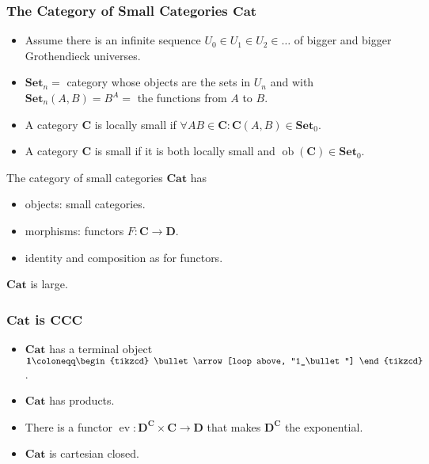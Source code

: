 \documentclass[UTF8,11pt,colorlinks,compress,openany]{beamer}%
\begin{document}
\begin{frame}\frametitle{The Category of Small Categories $\mathbf{Cat}$}
\begin{itemize}
	\item Assume there is an infinite sequence $U_0\in U_1\in U_2\in\dots$ of bigger and bigger Grothendieck universes.
	\item $\mathbf{Set}_n=$ category whose objects are the sets in $U_n$ and with $\mathbf{Set}_n(A,B)=B^A=$ the functions from $A$ to $B$.
	\item A category $\mathbf{C}$ is locally small if $\forall AB\in\mathbf{C}: \mathbf{C}(A,B)\in\mathbf{Set}_0$.
	\item A category $\mathbf{C}$ is small if it is both locally small and $\operatorname{ob}(\mathbf{C})\in\mathbf{Set}_0$.
\end{itemize}
\begin{definition}
The category of small categories $\mathbf{Cat}$ has
\begin{itemize}
	\item objects: small categories.
	\item morphisms: functors $F:\mathbf{C}\to\mathbf{D}$.
	\item identity and composition as for functors.
\end{itemize}
\end{definition}
$\mathbf{Cat}$ is large.
\end{frame}

\begin{frame}\frametitle{$\mathbf{Cat}$ is $\mathbf{CCC}$}
\begin{itemize}
	\item $\mathbf{Cat}$ has a terminal object $\mathbf{1}\coloneqq \begin{tikzcd}
	\bullet \arrow[loop above, "1_\bullet"]
\end{tikzcd}$.
	\item $\mathbf{Cat}$ has products.
	\item There is a functor $\operatorname{ev}: \mathbf{D}^{\mathbf{C}}\times\mathbf{C}\to\mathbf{D}$ that makes $\mathbf{D}^{\mathbf{C}}$ the exponential.
	\item $\mathbf{Cat}$ is cartesian closed.
\end{itemize}
\end{frame}
\end{document}
